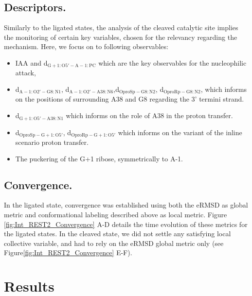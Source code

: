 \documentclass[journal=jacsat,manuscript=article]{achemso}
\begin{document}
\subsection{Descriptors.}


Similarly to the ligated states, 
the analysis of the cleaved catalytic site implies the monitoring of certain key variables, 
chosen for the relevancy regarding the mechanism.
Here, we focus on to following observables: 
\begin{itemize}
    \item IAA and d$_\mathrm{G+1:O5' - A-1:PC}$ which are the key observables for the nucleophilic attack,
    \item d$_\mathrm{A-1:O2' - G8:N1}$, d$_\mathrm{A-1:O2' - A38:N6}$,d$_\mathrm{OproSp - G8:N2}$, d$_\mathrm{OproRp - G8:N2}$, which informs on the positions of surrounding A38 and G8 regarding the 3' termini strand.
    \item d$_\mathrm{G+1:O5' - A38:N1}$ which informs on the role of A38 in the proton transfer.
    \item d$_\mathrm{OproSp - G+1:O5'}$, d$_\mathrm{OproRp - G+1:O5'}$ which informs on the variant of the inline scenario proton transfer.
    \item The puckering of the G+1 ribose, symmetrically to A-1.
\end{itemize}

\subsection{Convergence.}
In the ligated state, convergence was established using both the eRMSD as global metric
 and conformational labeling described above as local metric.
Figure \ref{fig:Int_REST2_Convergence} A-D details the time evolution of these metrics for the ligated states.
In the cleaved state, we did not settle any satisfying local collective variable, and had to rely on the eRMSD global metric only 
(see Figure\ref{fig:Int_REST2_Convergence} E-F).



\section{Results}
\end{document}
